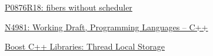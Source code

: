 \documentclass[fontsize=10pt,paper=A4,pagesize,DIV=15]{scrartcl}
\begin{document}
\newpage
{}
\begin{thebibliography}{99}

        \href{https://www.open-std.org/jtc1/sc22/wg21/docs/papers/2024/p0876r18.pdf}
        {P0876R18: fibers without scheduler}

        \href{https://www.open-std.org/jtc1/sc22/wg21/docs/papers/2024/n4981.pdf}
        {N4981: Working Draft, Programming Languages -- C++}

        \href{https://www.boost.org/doc/libs/release/doc/html/thread/thread_local_storage.html}
        {Boost C++ Libraries: Thread Local Storage}

\end{thebibliography}

\end{document}

